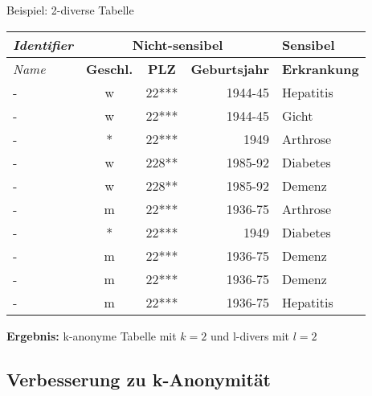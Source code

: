 \begin{frame}{Beispiel: 2-diverse Tabelle}
	\begin{center}
			\begin{tabular}{|l|c|c|r|l|}
		\hline \textit{Identifier} & \multicolumn{3}{c|}{\textbf{Nicht-sensibel}} & \textbf{Sensibel} \\ 
		\hline \textit{Name} & \textbf{Geschl.} & \textbf{PLZ} & \textbf{Geburtsjahr} & \textbf{Erkrankung} \\ \hline
		\hline \rowcolor{svshellblau1!30} 	- & w & 22*** & 1944-45 & Hepatitis \\ 
		\hline \rowcolor{svshellblau1!30}	- & w & 22*** & 1944-45 & Gicht \\ 
		\hline \rowcolor{svsgrau1!30} 		- & * & 22*** & 1949 & Arthrose \\ 
		\hline \rowcolor{svshellblau2!30} 	- & w & 228** & 1985-92 & Diabetes \\
		\hline \rowcolor{svshellblau2!30} 	- & w & 228** & 1985-92 & Demenz \\  
		\hline \rowcolor{svsrot!30} 		- & m & 22*** & 1936-75 & Arthrose \\ 
		\hline \rowcolor{svsgrau1!30} 		- & * & 22*** & 1949 & Diabetes \\ 
		\hline \rowcolor{svsrot!30} 		- & m & 22*** & 1936-75 & Demenz \\ 
		\hline \rowcolor{svsrot!30} 		- & m & 22*** & 1936-75 & Demenz \\ 
		\hline \rowcolor{svsrot!30} 		- & m & 22*** & 1936-75 & Hepatitis \\ 
		\hline 
		\end{tabular}
		\vspace{0.5cm}
        
		\textbf{Ergebnis:} k-anonyme Tabelle mit \(k=2\) und l-divers mit \(l=2\)
	\end{center}
\end{frame}


\subsection{Verbesserung zu k-Anonymität}

